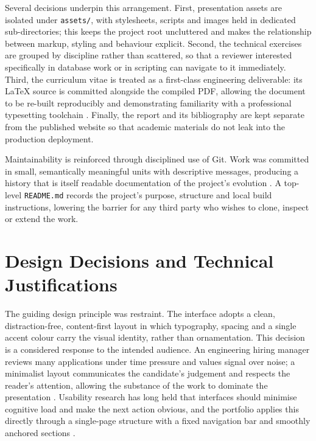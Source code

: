 \documentclass[11pt,a4paper]{article}
\begin{document}
Several decisions underpin this arrangement. First, presentation assets are isolated under \texttt{assets/}, with stylesheets, scripts and images held in dedicated sub-directories; this keeps the project root uncluttered and makes the relationship between markup, styling and behaviour explicit. Second, the technical exercises are grouped by discipline rather than scattered, so that a reviewer interested specifically in database work or in scripting can navigate to it immediately. Third, the curriculum vitae is treated as a first-class engineering deliverable: its \LaTeX{} source is committed alongside the compiled PDF, allowing the document to be re-built reproducibly and demonstrating familiarity with a professional typesetting toolchain \citep{lamport1994}. Finally, the report and its bibliography are kept separate from the published website so that academic materials do not leak into the production deployment.

Maintainability is reinforced through disciplined use of Git. Work was committed in small, semantically meaningful units with descriptive messages, producing a history that is itself readable documentation of the project's evolution \citep{chacon2014}. A top-level \texttt{README.md} records the project's purpose, structure and local build instructions, lowering the barrier for any third party who wishes to clone, inspect or extend the work.

\section{Design Decisions and Technical Justifications}
The guiding design principle was restraint. The interface adopts a clean, distraction-free, content-first layout in which typography, spacing and a single accent colour carry the visual identity, rather than ornamentation. This decision is a considered response to the intended audience. An engineering hiring manager reviews many applications under time pressure and values signal over noise; a minimalist layout communicates the candidate's judgement and respects the reader's attention, allowing the substance of the work to dominate the presentation \citep{krug2014}. Usability research has long held that interfaces should minimise cognitive load and make the next action obvious, and the portfolio applies this directly through a single-page structure with a fixed navigation bar and smoothly anchored sections \citep{nielsen1994}.
\end{document}

